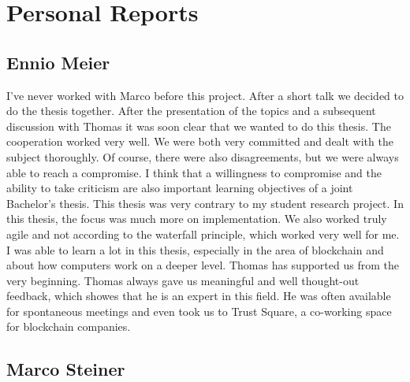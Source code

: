 \chapter{Personal Reports}
\section{Ennio Meier}
I've never worked with Marco before this project. After a short talk we decided to do the thesis together. After the presentation of the topics and a subsequent discussion with Thomas it was soon clear that we wanted to do this thesis. The cooperation worked very well. We were both very committed and dealt with the subject thoroughly. Of course, there were also disagreements, but we were always able to reach a compromise. I think that a willingness to compromise and the ability to take criticism are also important learning objectives of a joint Bachelor's thesis. This thesis was very contrary to my student research project. In this thesis, the focus was much more on implementation. We also worked truly agile and not according to the waterfall principle, which worked very well for me. I was able to learn a lot in this thesis, especially in the area of blockchain and about how computers work on a deeper level. Thomas has supported us from the very beginning. Thomas always gave us meaningful and well thought-out feedback, which showes that he is an expert in this field. He was often available for spontaneous meetings and even took us to Trust Square, a co-working space for blockchain companies. 

\section{Marco Steiner}